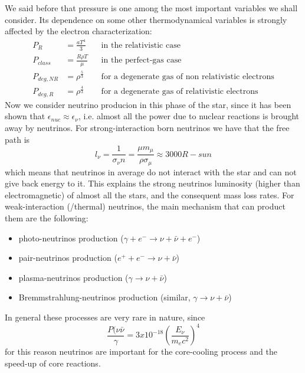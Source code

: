 \documentclass[main.tex]{subfiles}
\begin{document}
We said before that pressure is one among the most important variables we shall consider. Its dependence on some other thermodynamical variables is strongly affected by the electron characterization:
%
\begin{subequations}
\begin{align}
P_R &=\frac{aT^4}{3} && \text{in the relativistic case}\\
P_{class} &=\frac{R\rho T}{\mu} && \text{in the perfect-gas case}\\
P_{deg,NR} &=\rho^{\frac{5}{3}} && \text{for a degenerate gas of non relativistic electrons} \\
P_{deg,R} &=\rho^{\frac{4}{3}} && \text{for a degenerate gas of relativistic electrons}
\end{align}
\end{subequations}
%
Now we consider neutrino producion in this phase of the star, since it has been shown that $\epsilon_{nuc}\approx\epsilon_\nu$, i.e. almost all the power due to nuclear reactions is brought away by neutrinos. For strong-interaction born neutrinos we have that the free path is
%
\begin{equation}
    l_\nu=\frac{1}{\sigma_\nu n}=\frac{\mu m_\mu}{\rho\sigma_\mu}\approx 3000 R-sun
\end{equation}
%
which means that neutrinos in average do not interact with the star and can not give back energy to it. This explains the strong neutrinos luminosity (higher than electromagnetic) of almost all the stars, and the consequent mass loss rates.
For weak-interaction (/thermal) neutrinos, the main mechanism that can product them are the following:
\begin{itemize}
    \item photo-neutrinos production ($\gamma+e^- \to \nu + \bar\nu +e^-$)
    \item pair-neutrinos production ($e^++e^- \to \nu + \bar\nu $)
    \item plasma-neutrinos production ($\gamma \to \nu + \bar\nu $)
    \item Bremmstrahlung-neutrinos production (similar, $\gamma \to \nu + \bar\nu $)
\end{itemize}
In general these processes are very rare in nature, since
\begin{equation}
    \frac{P(\nu\bar\nu}{\gamma}=3x10^{-18}\left(\frac{E_\nu}{m_e c^2}\right)^4
\end{equation}
for this reason neutrinos are important for the core-cooling process and the speed-up of core reactions.
\end{document}
